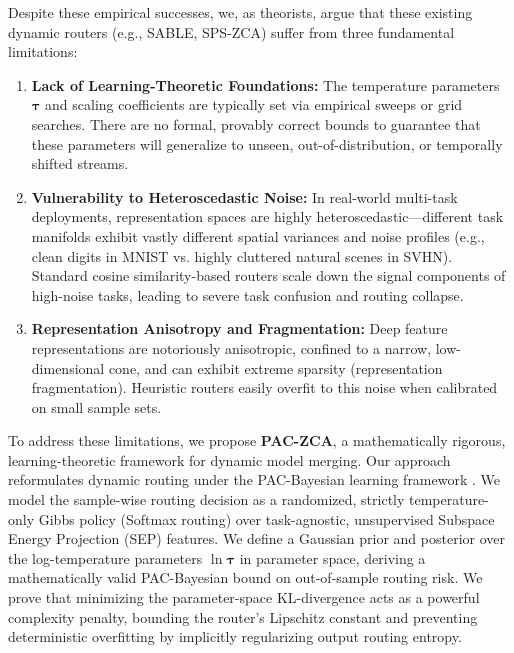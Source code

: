 Despite these empirical successes, we, as theorists, argue that these existing dynamic routers (e.g., SABLE, SPS-ZCA) suffer from three fundamental limitations:
\begin{enumerate}
    \item \textbf{Lack of Learning-Theoretic Foundations:} The temperature parameters $\boldsymbol{\tau}$ and scaling coefficients are typically set via empirical sweeps or grid searches. There are no formal, provably correct bounds to guarantee that these parameters will generalize to unseen, out-of-distribution, or temporally shifted streams.
    \item \textbf{Vulnerability to Heteroscedastic Noise:} In real-world multi-task deployments, representation spaces are highly heteroscedastic—different task manifolds exhibit vastly different spatial variances and noise profiles (e.g., clean digits in MNIST vs. highly cluttered natural scenes in SVHN). Standard cosine similarity-based routers scale down the signal components of high-noise tasks, leading to severe task confusion and routing collapse.
    \item \textbf{Representation Anisotropy and Fragmentation:} Deep feature representations are notoriously anisotropic, confined to a narrow, low-dimensional cone, and can exhibit extreme sparsity (representation fragmentation). Heuristic routers easily overfit to this noise when calibrated on small sample sets.
\end{enumerate}

To address these limitations, we propose \textbf{PAC-ZCA}, a mathematically rigorous, learning-theoretic framework for dynamic model merging. Our approach reformulates dynamic routing under the PAC-Bayesian learning framework \cite{mcallester1999pac}. We model the sample-wise routing decision as a randomized, strictly temperature-only Gibbs policy (Softmax routing) over task-agnostic, unsupervised Subspace Energy Projection (SEP) features. We define a Gaussian prior and posterior over the log-temperature parameters $\ln \boldsymbol{\tau}$ in parameter space, deriving a mathematically valid PAC-Bayesian bound on out-of-sample routing risk. We prove that minimizing the parameter-space KL-divergence acts as a powerful complexity penalty, bounding the router's Lipschitz constant and preventing deterministic overfitting by implicitly regularizing output routing entropy.


